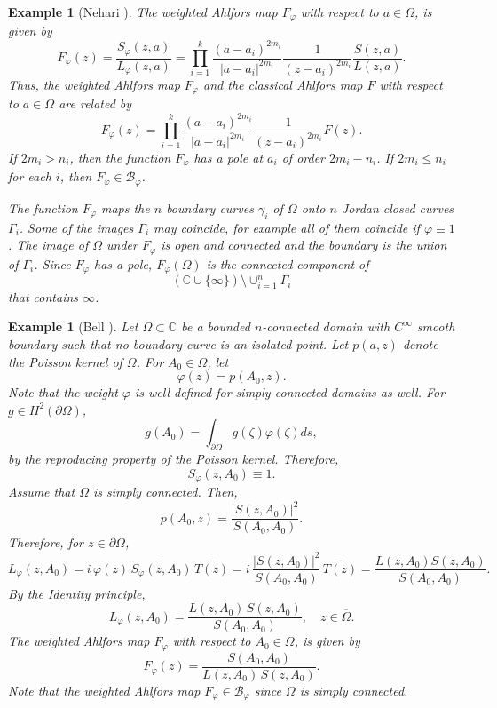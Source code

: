 \documentclass[11pt, reqno]{amsart}
\newtheorem{exam}[thm]{Example}
\numberwithin{equation}{section}
\newcommand{\Om}{\Omega}
\begin{document}
\begin{exam}[Nehari \cite{Nehari}]
		\medskip
		
		The weighted Ahlfors map $F_{\varphi}$ with respect to $a\in\Om$, is given by
		\[
		F_{\varphi}(z) = \frac{S_{\varphi}(z,a)}{L_{\varphi}(z,a)} 
		=
		\prod_{i=1}^k\frac{(a-a_i)^{2m_i}}{\vert a - a_i\vert^{2m_i}} \frac{1}{(z-a_i)^{2m_i}} 
		\frac{S(z,a)}{L(z,a)}.
		\]
		Thus, the weighted Ahlfors map $F_{\varphi}$ and the classical Ahlfors map $F$ with respect to $a\in \Om$ are related by
		\[
		F_{\varphi}(z) = \prod_{i=1}^k\frac{(a-a_i)^{2m_i}}{\vert a - a_i\vert^{2m_i}} \frac{1}{(z-a_i)^{2m_i}} 
		F(z).
		\] 
		If $2m_i > n_i$, then the function $F_{\varphi}$ has a pole at $a_i$ of order $2m_i-n_i$. If $2m_i\leq n_i$ for each $i$, then $F_{\varphi}\in \mathcal{B}_{\varphi}$.
		
		\medskip
		
		The function $F_{\varphi}$ maps the $n$ boundary curves $\gamma_i$ of $\Om$ onto $n$ Jordan closed curves $\Gamma_i$. Some of the images $\Gamma_i$ may coincide, for example all of them coincide if $\varphi\equiv 1$. The image of $\Om$ under $F_{\varphi}$ is open and connected and the boundary is the union of $\Gamma_i$. Since $F_{\varphi}$ has a pole, $F_{\varphi}(\Om)$ is the connected component of 
		\[
		(\mathbb{C}\cup\{\infty\} )\setminus \cup_{i=1}^n\Gamma_i
		\]
		that contains $\infty$.
	\end{exam}
	
	\begin{exam}[Bell \cite{Be1}]
		Let $\Omega\subset\mathbb{C}$ be a bounded $n$-connected domain with $C^{\infty}$ smooth boundary such that no boundary curve is an isolated point. Let $p(a,z)$ denote the Poisson kernel of $\Om$. For $A_0\in\Om$, let 
		\[
		\varphi(z) = p(A_0,z).
		\]
		Note that the weight $\varphi$ is well-defined for simply connected domains as well. For $g\in H^2(\partial\Om)$,
		\[
		g(A_0) = \int_{\partial\Om} g(\zeta) \varphi(\zeta) ds,
		\]
		by the reproducing property of the Poisson kernel. Therefore,
		\[
		S_{\varphi}(z,A_0) \equiv 1.
		\]
		Assume that $\Om$ is simply connected. Then,
		\[
		p(A_0,z) = \frac{\vert S(z,A_0)\vert^2}{S(A_0,A_0)}.
		\]
		Therefore, for $z\in\partial\Om$,
		\[
		L_{\varphi}(z,A_0) 
		=
		i \, \varphi(z) \, \overline{S_{\varphi}(z,A_0)} \, \overline{T(z)}
		=
		i \, \frac{\vert S(z,A_0)\vert^2}{S(A_0,A_0)} \, \overline{T(z)} = \frac{L(z,A_0) S(z,A_0)}{S(A_0,A_0)}.
		\]
		By the Identity principle,
		\[
		L_{\varphi}(z,A_0)  = \frac{L(z,A_0) \, S(z,A_0)}{S(A_0,A_0)}, \quad z\in\overline{\Om}.
		\]
		The weighted Ahlfors map $F_{\varphi}$ with respect to $A_0\in\Om$, is given by
		\[
		F_{\varphi}(z) = \frac{S(A_0,A_0)}{L(z,A_0) \, S(z,A_0)}.
		\]
		Note that the weighted Ahlfors map $F_{\varphi}\in \mathcal{B}_{\varphi}$ since $\Om$ is simply connected.
	\end{exam}
	
\end{document}

